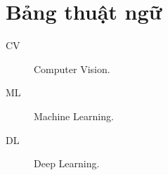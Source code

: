 \chapter*{Bảng thuật ngữ}

\begin{description}
  \item[CV] Computer Vision.
  \item[ML] Machine Learning.
  \item[DL] Deep Learning.
\end{description}

\clearpage
